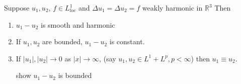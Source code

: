\documentclass[11pt]{article}
\begin{document}
\begin{proposition}
    Suppose $u_1, u_2$, $f \in L_{loc}^{1}$ and $\Delta u_1 = \Delta u_2 = f$ weakly harmonic in $\mathbb{R}^{3}$
    Then
    \begin{enumerate}
        \item $u_1 - u_2$ is smooth and harmonic 
        \item If $u_1,u_2$ are bounded, $u_1-u_2$ is constant.
        \item If $|u_1|, |u_2| \longrightarrow 0$ as $|x| \longrightarrow \infty$, (say $u_1,u_2 \in
        L^{1} + L^{p}, p < \infty$)
        then $u_1 \equiv u_2$.
        \begin{exercise}
            show $u_1 - u_2$ is bounded
        \end{exercise}
    \end{enumerate}
\end{proposition}
\end{document}

